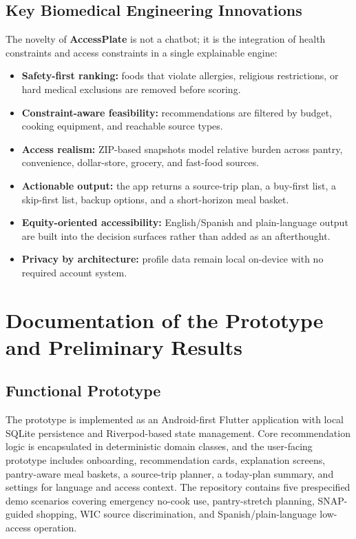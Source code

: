 \documentclass[11pt,letterpaper]{article}
\newcommand{\app}{\textbf{AccessPlate}}
\begin{document}
\subsection{Key Biomedical Engineering Innovations}
The novelty of \app{} is not a chatbot; it is the integration of health constraints and access constraints in a single explainable engine:
\begin{itemize}
\item \textbf{Safety-first ranking:} foods that violate allergies, religious restrictions, or hard medical exclusions are removed before scoring.
\item \textbf{Constraint-aware feasibility:} recommendations are filtered by budget, cooking equipment, and reachable source types.
\item \textbf{Access realism:} ZIP-based snapshots model relative burden across pantry, convenience, dollar-store, grocery, and fast-food sources.
\item \textbf{Actionable output:} the app returns a source-trip plan, a buy-first list, a skip-first list, backup options, and a short-horizon meal basket.
\item \textbf{Equity-oriented accessibility:} English/Spanish and plain-language output are built into the decision surfaces rather than added as an afterthought.
\item \textbf{Privacy by architecture:} profile data remain local on-device with no required account system.
\end{itemize}

\section{Documentation of the Prototype and Preliminary Results}
\subsection{Functional Prototype}
The prototype is implemented as an Android-first Flutter application with local SQLite persistence and Riverpod-based state management. Core recommendation logic is encapsulated in deterministic domain classes, and the user-facing prototype includes onboarding, recommendation cards, explanation screens, pantry-aware meal baskets, a source-trip planner, a today-plan summary, and settings for language and access context. The repository contains five prespecified demo scenarios covering emergency no-cook use, pantry-stretch planning, SNAP-guided shopping, WIC source discrimination, and Spanish/plain-language low-access operation.
\end{document}
